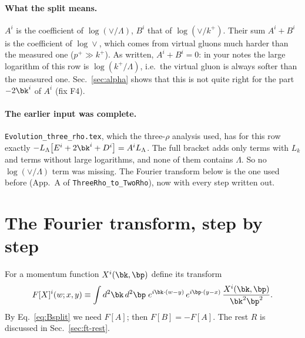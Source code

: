 \paragraph{What the split means.} $A^i$ is the coefficient of $\log(\vee/\Lambda)$, $B^i$ that of $\log(\vee/k^+)$. Their sum $A^i+B^i$ is the coefficient of $\log\vee$, which comes from virtual gluons much harder than the measured one ($p^+\gg k^+$). As written, $A^i+B^i=0$: in your notes the large logarithm of this row is $\log(k^+/\Lambda)$, i.e.\ the virtual gluon is always softer than the measured one. Sec.~\ref{sec:alpha} shows that this is not quite right for the part $-2\bk^i$ of $A^i$ (fix F4).

\paragraph{The earlier input was complete.} \texttt{Evolution\_three\_rho.tex}, which the three-$\rho$ analysis used, has for this row exactly $-L_\Lambda\big[E^i+2\bk^i+D^i\big]=A^iL_\Lambda$. The full bracket adds only terms with $L_k$ and terms without large logarithms, and none of them contains $\Lambda$. So no $\log(\vee/\Lambda)$ term was missing. The Fourier transform below is the one used before (App.~A of \texttt{ThreeRho\_to\_TwoRho}), now with every step written out.

\section{The Fourier transform, step by step}\label{sec:ft-steps}
For a momentum function $X^i(\bk,\bp)$ define its transform
\begin{equation}
F[X]^i(w;x,y)\equiv\int d^2\bk\,d^2\bp\;e^{i\bk\cdot(w-y)}\,e^{i\bp\cdot(y-x)}\,\frac{X^i(\bk,\bp)}{\bk^2\bp^2}.
\end{equation}
By Eq.~\eqref{eq:Bsplit} we need $F[A]$; then $F[B]=-F[A]$. The rest $R$ is discussed in Sec.~\ref{sec:ft-rest}.

